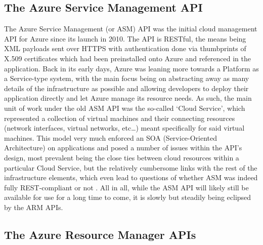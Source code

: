\documentclass[11pt]{report}
\begin{document}
\subsection{The Azure Service Management API}

The Azure Service Management (or ASM) API was the initial cloud management API
for Azure since its launch in 2010. The API is RESTful, the means being XML
payloads sent over HTTPS with authentication done via thumbprints of X.509
certificates which had been preinstalled onto Azure and referenced in the
application.
Back in its early days, Azure was leaning more towards a Platform as a
Service-type system, with the main focus being on abstracting
away as many details of the infrastructure as possible and allowing developers
to deploy their application directly and let Azure manage its resource needs.
\newline
As such, the main unit of work under the old ASM API was the so-called `Cloud
Service', which represented a collection of virtual machines and their
connecting resources (network interfaces, virtual networks, etc\ldots) meant
specifically for said virtual machines. This model very much enforced an SOA
(Service-Oriented Architecture) on applications and posed a number of issues
within the API's design, most prevalent being the close ties between cloud
resources within a particular Cloud Service, but the relatively cumbersome
links with the rest of the infrastructure elements, which even lead to
questions of whether ASM was indeed fully REST-compliant or not
\cite{asmNetworkingIssue}. \newline
All in all, while the ASM API will likely still be available for use for a long
time to come, it is slowly but steadily being eclipsed by the ARM APIs.


\subsection{The Azure Resource Manager APIs}
\end{document}
